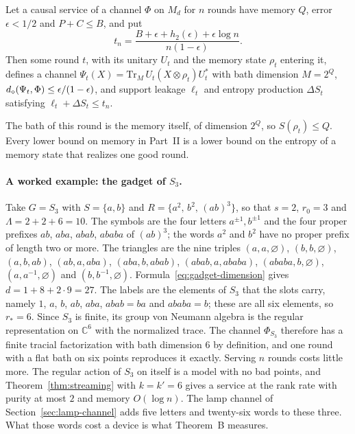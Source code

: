 \begin{theorem}\label{thm:extraction}
Let a causal service of a channel $\Phi$ on $M_d$ for $n$ rounds have memory $Q$, error $\epsilon<1/2$ and $P+C\le B$, and put
\[
t_n=\frac{B+\epsilon+h_2(\epsilon)+\epsilon\log n}{n(1-\epsilon)} .
\]
Then some round $t$, with its unitary $U_t$ and the memory state $\rho_t$ entering it, defines a channel $\Psi_t(X)=\mathrm{Tr}_M\,U_t(X\otimes\rho_t)U_t^*$
with bath dimension $M=2^Q$, $d_\diamond(\Psi_t,\Phi)\le\epsilon/(1-\epsilon)$, and support leakage $\ell_t$ and entropy production $\Delta S_t$ satisfying
$\ell_t+\Delta S_t\le t_n$.
\end{theorem}

The bath of this round is the memory itself, of dimension $2^Q$, so $S(\rho_t)\le Q$. Every lower bound on memory in Part~II is a lower bound
on the entropy of a memory state that realizes one good round.

\paragraph{A worked example: the gadget of $S_3$.} Take $G=S_3$ with $S=\{a,b\}$ and $R=\{a^2,\,b^2,\,(ab)^3\}$, so that $s=2$, $r_0=3$ and
$\Lambda=2+2+6=10$. The symbols are the four letters $a^{\pm1},b^{\pm1}$ and the four proper prefixes $ab$, $aba$, $abab$, $ababa$ of
$(ab)^3$; the words $a^2$ and $b^2$ have no proper prefix of length two or more. The triangles are the nine triples $(a,a,\varnothing)$,
$(b,b,\varnothing)$, $(a,b,ab)$, $(ab,a,aba)$, $(aba,b,abab)$, $(abab,a,ababa)$, $(ababa,b,\varnothing)$, $(a,a^{-1},\varnothing)$ and
$(b,b^{-1},\varnothing)$. Formula~\eqref{eq:gadget-dimension} gives $d=1+8+2\cdot9=27$. The labels are the elements of $S_3$ that the slots
carry, namely $1$, $a$, $b$, $ab$, $aba$, $abab=ba$ and $ababa=b$; these are all six elements, so $r_*=6$. Since $S_3$ is finite, its group
von Neumann algebra is the regular representation on $\mathbb C^6$ with the normalized trace. The channel $\Phi_{S_3}$ therefore has a finite
tracial factorization with bath dimension $6$ by definition, and one round with a flat bath on six points reproduces it exactly. Serving $n$
rounds costs little more. The regular action of $S_3$ on itself is a model with no bad points, and Theorem~\ref{thm:streaming} with $k=k'=6$ gives a
service at the rank rate with purity at most $2$ and memory $O(\log n)$. The lamp channel of Section~\ref{sec:lamp-channel} adds five letters
and twenty-six words to these three. What those words cost a device is what Theorem~B measures.
